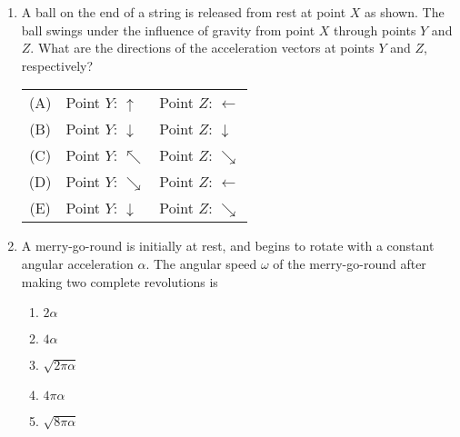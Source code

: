 \documentclass{../../../oss-classkick}
\begin{document}
\begin{multicols*}{2}
  \begin{enumerate}[leftmargin=18pt,resume]
  \item A ball on the end of a string is released from rest at point $X$ as
    shown. The ball swings under the influence of gravity from point $X$ through
    points $Y$ and $Z$. What are the directions of the acceleration vectors at
    points $Y$ and $Z$, respectively?
    \begin{tabular}{cll}
      (A) & Point $Y$: {\LARGE $\uparrow$} & Point $Z$: {\LARGE $\leftarrow$}\\
      (B) & Point $Y$: {\LARGE $\downarrow$}& Point $Z$: {\LARGE $\downarrow$}\\
      (C) & Point $Y$: {\LARGE $\nwarrow$} & Point $Z$: {\LARGE $\searrow$}\\
      (D) & Point $Y$: {\LARGE $\searrow$} & Point $Z$: {\LARGE $\leftarrow$}\\
      (E) & Point $Y$: {\LARGE $\downarrow$} & Point $Z$: {\LARGE $\searrow$}\\
    \end{tabular}
    \vspace{.7in}
    
  \item A merry-go-round is initially at rest, and begins to rotate with a
    constant angular acceleration $\alpha$. The angular speed $\omega$ of the
    merry-go-round after making two complete revolutions is
    \begin{enumerate}[nosep,leftmargin=18pt,label=(\Alph*)]
    \item $2\alpha$
    \item $4\alpha$
    \item $\sqrt{2\pi\alpha}$
    \item $4\pi\alpha$
    \item $\sqrt{8\pi\alpha}$
    \end{enumerate}
  \end{enumerate}


\end{multicols*}
\end{document}
